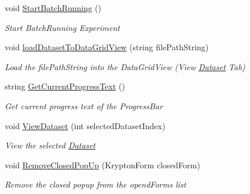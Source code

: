 \begin{DoxyCompactItemize}
void \hyperlink{class_acrive_crowd_g_u_i_1_1_main_page_af55cc0961293ddc033b6b171b4d7f311}{Start\+Batch\+Running} ()
\begin{DoxyCompactList}\small\item\em Start Batch\+Running Experiment \end{DoxyCompactList}\item 
void \hyperlink{class_acrive_crowd_g_u_i_1_1_main_page_ae2b44d06d706e9d4d538be1a53d24fcd}{load\+Dataset\+To\+Data\+Grid\+View} (string file\+Path\+String)
\begin{DoxyCompactList}\small\item\em Load the file\+Path\+String into the Data\+Grid\+View (View \hyperlink{class_acrive_crowd_g_u_i_1_1_dataset}{Dataset} Tab) \end{DoxyCompactList}\item 
string \hyperlink{class_acrive_crowd_g_u_i_1_1_main_page_af810e5e46d9b6739fbecf9b3235b1499}{Get\+Current\+Progress\+Text} ()
\begin{DoxyCompactList}\small\item\em Get current progress text of the Progress\+Bar \end{DoxyCompactList}\item 
void \hyperlink{class_acrive_crowd_g_u_i_1_1_main_page_acb2644029e8d2b5f7ae870aaad0b9488}{View\+Dataset} (int selected\+Dataset\+Index)
\begin{DoxyCompactList}\small\item\em View the selected \hyperlink{class_acrive_crowd_g_u_i_1_1_dataset}{Dataset} \end{DoxyCompactList}\item 
void \hyperlink{class_acrive_crowd_g_u_i_1_1_main_page_af7ce4b6c985fb66ca068699f6f5b5ed3}{Remove\+Closed\+Pop\+Up} (Krypton\+Form closed\+Form)
\begin{DoxyCompactList}\small\item\em Remove the closed popup from the opend\+Forms list \end{DoxyCompactList}\end{DoxyCompactItemize}
